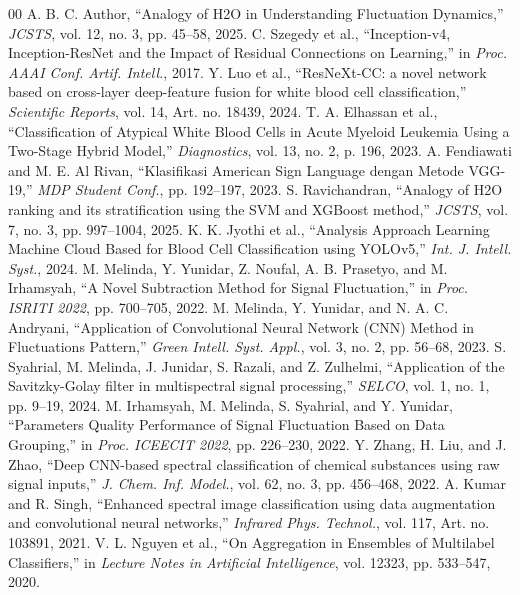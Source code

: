 \documentclass[conference]{IEEEtran}
\begin{document}
\begin{thebibliography}{00}
 A. B. C. Author, ``Analogy of H2O in Understanding Fluctuation Dynamics,'' \emph{JCSTS}, vol. 12, no. 3, pp. 45--58, 2025.
 C. Szegedy et al., ``Inception-v4, Inception-ResNet and the Impact of Residual Connections on Learning,'' in \emph{Proc. AAAI Conf. Artif. Intell.}, 2017.
 Y. Luo et al., ``ResNeXt-CC: a novel network based on cross-layer deep-feature fusion for white blood cell classification,'' \emph{Scientific Reports}, vol. 14, Art. no. 18439, 2024.
 T. A. Elhassan et al., ``Classification of Atypical White Blood Cells in Acute Myeloid Leukemia Using a Two-Stage Hybrid Model,'' \emph{Diagnostics}, vol. 13, no. 2, p. 196, 2023.
 A. Fendiawati and M. E. Al Rivan, ``Klasifikasi American Sign Language dengan Metode VGG-19,'' \emph{MDP Student Conf.}, pp. 192--197, 2023.
 S. Ravichandran, ``Analogy of H2O ranking and its stratification using the SVM and XGBoost method,'' \emph{JCSTS}, vol. 7, no. 3, pp. 997--1004, 2025.
 K. K. Jyothi et al., ``Analysis Approach Learning Machine Cloud Based for Blood Cell Classification using YOLOv5,'' \emph{Int. J. Intell. Syst.}, 2024.
 M. Melinda, Y. Yunidar, Z. Noufal, A. B. Prasetyo, and M. Irhamsyah, ``A Novel Subtraction Method for Signal Fluctuation,'' in \emph{Proc. ISRITI 2022}, pp. 700--705, 2022.
 M. Melinda, Y. Yunidar, and N. A. C. Andryani, ``Application of Convolutional Neural Network (CNN) Method in Fluctuations Pattern,'' \emph{Green Intell. Syst. Appl.}, vol. 3, no. 2, pp. 56--68, 2023.
 S. Syahrial, M. Melinda, J. Junidar, S. Razali, and Z. Zulhelmi, ``Application of the Savitzky-Golay filter in multispectral signal processing,'' \emph{SELCO}, vol. 1, no. 1, pp. 9--19, 2024.
 M. Irhamsyah, M. Melinda, S. Syahrial, and Y. Yunidar, ``Parameters Quality Performance of Signal Fluctuation Based on Data Grouping,'' in \emph{Proc. ICEECIT 2022}, pp. 226--230, 2022.
 Y. Zhang, H. Liu, and J. Zhao, ``Deep CNN-based spectral classification of chemical substances using raw signal inputs,'' \emph{J. Chem. Inf. Model.}, vol. 62, no. 3, pp. 456--468, 2022.
 A. Kumar and R. Singh, ``Enhanced spectral image classification using data augmentation and convolutional neural networks,'' \emph{Infrared Phys. Technol.}, vol. 117, Art. no. 103891, 2021.
 V. L. Nguyen et al., ``On Aggregation in Ensembles of Multilabel Classifiers,'' in \emph{Lecture Notes in Artificial Intelligence}, vol. 12323, pp. 533--547, 2020.

\end{thebibliography}
\end{document}
